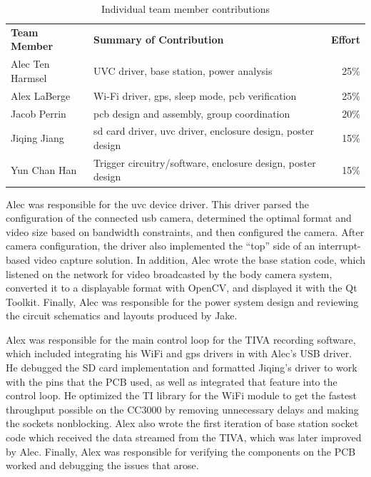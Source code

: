 \documentclass[12pt]{article}
\begin{document}
\begin{table}[h]
    \centering
    \caption{Individual team member contributions}
    \begin{tabular}{llr}
        \textbf{Team Member} & \textbf{Summary of Contribution} & \textbf{Effort}\\
        Alec Ten Harmsel & UVC driver, base station, power analysis & 25\%\\
        Alex LaBerge & Wi-Fi driver, \gls{gps}, sleep mode, \gls{pcb} verification & 25\%\\
        Jacob Perrin & \gls{pcb} design and assembly, group coordination & 20\%\\
        Jiqing Jiang & \gls{sd} card driver, \gls{uvc} driver, enclosure design, poster design & 15\%\\
        Yun Chan Han & Trigger circuitry/software, enclosure design, poster design & 15\%\\
    \end{tabular}
    \label{tab:individual_contrib}
\end{table}

Alec was responsible for the \gls{uvc} device driver. This driver parsed the
configuration of the connected \gls{usb} camera, determined the optimal format
and video size based on bandwidth constraints, and then configured the camera.
After camera configuration, the driver also implemented the “top” side of an
interrupt-based video capture solution. In addition, Alec wrote the base
station code, which listened on the network for video broadcasted by the body
camera system, converted it to a displayable format with OpenCV, and displayed
it with the Qt Toolkit. Finally, Alec was responsible for the power system
design and reviewing the circuit schematics and layouts produced by Jake.

Alex was responsible for the main control loop for the TIVA recording software,
which included integrating his WiFi and \gls{gps} drivers in with Alec's USB driver.
He debugged the SD card implementation and formatted Jiqing's driver to work with
the pins that the PCB used, as well as integrated that feature into the control loop. 
He optimized the TI library for the WiFi module to get the fastest throughput
possible on the CC3000 by removing unnecessary delays and making the sockets
nonblocking. Alex also wrote the first iteration of base station socket code
which received the data streamed from the TIVA, which was later improved by
Alec. Finally, Alex was responsible for verifying the components on the PCB
worked and debugging the issues that arose.
\end{document}
